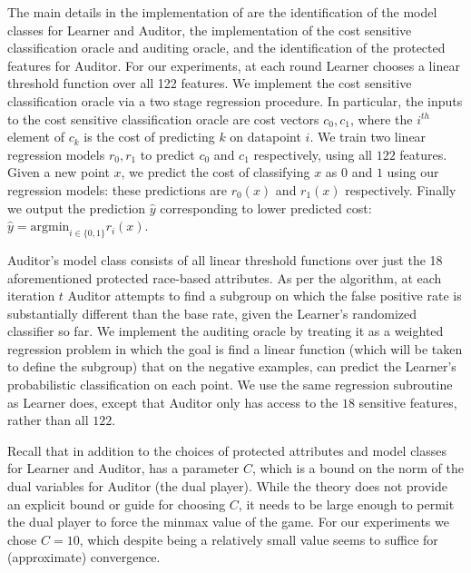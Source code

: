 The main details in the implementation of \FFP are the identification of the
model classes for Learner and Auditor, the implementation of the cost sensitive classification oracle and auditing oracle, and the identification of the protected features for Auditor.
For our experiments, at each round Learner chooses a linear threshold function over all 122 features. We implement the cost sensitive classification oracle via a two stage regression procedure.  In particular, the inputs to the cost sensitive classification oracle are cost vectors $c_0, c_1$, where the $i^{th}$ element of $c_k$
is the cost of predicting $k$ on datapoint $i$. We train two linear regression
models $r_0, r_1$ to predict $c_0$ and $c_1$ respectively, using all $122$ features. Given a new point $x$, we predict the cost
of classifying $x$ as $0$ and $1$ using our regression models: these predictions are $r_0(x)$ and $r_1(x)$ respectively. Finally we output the prediction $\hat{y}$ corresponding to lower predicted cost:
$\hat{y} = \text{argmin}_{i \in \{0,1\}}r_i(x)$.

Auditor's model class consists of all linear threshold functions over just the 18 aforementioned protected
race-based attributes. As per the algorithm, at each iteration $t$ Auditor attempts to find a subgroup on which the false positive rate is substantially different than the base rate, given the Learner's randomized classifier so far. We implement the auditing oracle  by treating it as a weighted regression problem in which
the goal is find a linear function (which will be taken to define the subgroup) that on the negative examples, can predict the Learner's probabilistic classification on each point. We use the same regression subroutine as Learner does, except that Auditor only has access to the $18$ sensitive features, rather than all $122$.

Recall that in addition to the choices of protected attributes and model classes for Learner and
Auditor, \FFP has a parameter $C$, which is a bound on the norm of the dual variables for Auditor (the dual player).
While the theory does not provide an explicit bound or guide for choosing $C$, it needs to be large enough
to permit the dual player to force the minmax value of the game.
For our experiments we chose $C = 10$, which despite being a relatively small value seems to
suffice for (approximate) convergence.

